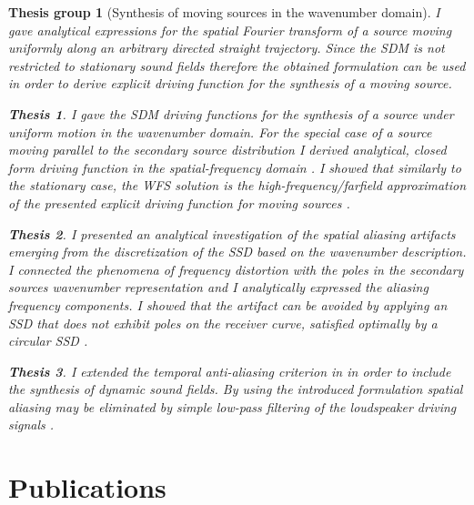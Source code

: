 \documentclass[10pt,twoside]{article}
\theoremstyle{thesisgroupstyle}
\newtheorem{thesisgroup}{Thesis group}
\theoremstyle{indented}
\newtheorem{thesis}{Thesis}[thesisgroup]
\begin{document}
\begin{thesisgroup}[Synthesis of moving sources in the wavenumber domain]

I gave analytical expressions for the spatial Fourier transform of a source moving uniformly along an arbitrary directed straight trajectory. 
Since the SDM is not restricted to stationary sound fields therefore the obtained formulation can be used in order to derive explicit driving function for the synthesis of a moving source.
\begin{thesis} 
I gave the SDM driving functions for the synthesis of a source under uniform motion in the wavenumber domain.
For the special case of a source moving parallel to the secondary source distribution I derived analytical, closed form driving function in the spatial-frequency domain \cite{Firtha2014:daga_booklet, Firtha2014:isma_booklet, firtha2015sound_booklet}.
I showed that similarly to the stationary case, the WFS solution is the high-frequency/farfield approximation of the presented explicit driving function for moving sources \cite{firtha2015sound_booklet}. 
\end{thesis}
\begin{thesis} 
I presented an analytical investigation of the spatial aliasing artifacts emerging from the discretization of the SSD based on the wavenumber description.
I connected the phenomena of frequency distortion with the poles in the secondary sources wavenumber representation and I analytically expressed the aliasing frequency components.
I showed that the artifact can be avoided by applying an SSD that does not exhibit poles on the receiver curve, satisfied optimally by a circular SSD \cite{firtha2016:daga_booklet}.
\end{thesis}
\begin{thesis} 
I extended the temporal anti-aliasing criterion in in order to include the synthesis of dynamic sound fields.
By using the introduced formulation spatial aliasing may be eliminated by simple low-pass filtering of the loudspeaker driving signals \cite{Firtha2018_daga_moving_source_booklet}.
\end{thesis}
\end{thesisgroup} 
\clearpage
\section*{Publications}

\nocite{*}
\begin{refcontext}[labelprefix=J]
\printbibliography[title={Journal papers}, keyword=J, heading=subbibliography] 
\end{refcontext}
\begin{refcontext}[labelprefix=C]
\printbibliography[title={Conference papers}, keyword=C, heading=subbibliography] 
\end{refcontext}
\begin{refcontext}[labelprefix=O]
\printbibliography[title={Other publications}, keyword=O, heading=subbibliography] 
\end{refcontext}
\end{document}
